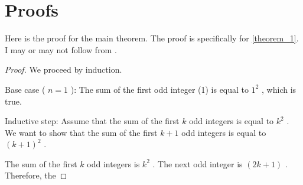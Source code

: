 \documentclass{article}
\begin{document}
\section{Proofs}
\label{section:Proofs}
Here is the proof for the main theorem. The proof is specifically for \autoref{theorem_1}. I may or may not follow from \cite{rudelsonSparseReconstructionFourier2008}.

\begin{proof}
\label{proof:theorem_1}
We proceed by induction.

Base case ( $n = 1$ ): The sum of the first odd integer (1) is equal to  $1^2$ , which is true.

Inductive step: Assume that the sum of the first  $k$  odd integers is equal to  $k^2$ . We want to show that the sum of the first  $k+1$  odd integers is equal to  $(k+1)^2$ .

The sum of the first  $k$  odd integers is  $k^2$ . The next odd integer is  $(2k+1)$ . Therefore, the


\end{proof}


\printbibliography
\end{document}

